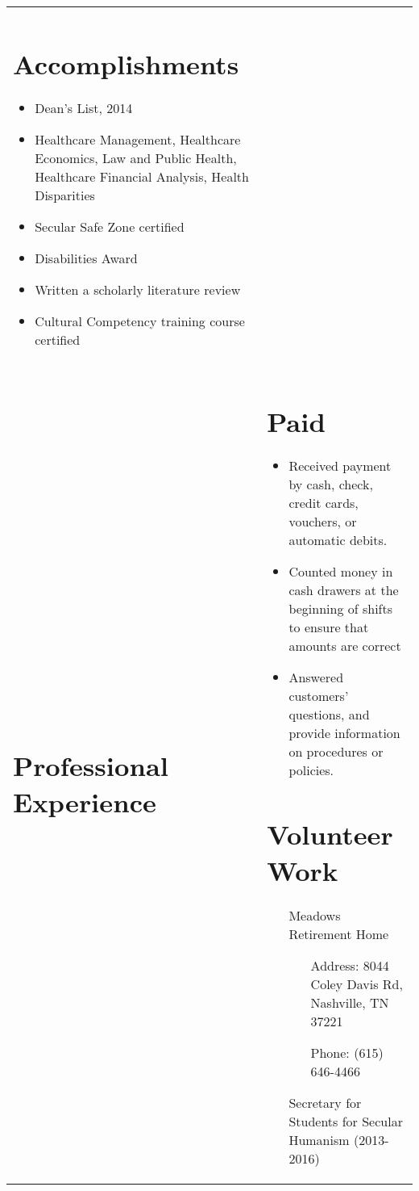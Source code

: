 \documentclass[10pt]{article} %
\begin{document}
\begin{tabularx}{\textwidth}{p{3cm} X}
\section*{Accomplishments}
\begin{itemize}
\setlength{\itemsep}{1pt}
\item Dean's List, 2014
\item Healthcare Management, Healthcare Economics, Law and Public Health, Healthcare
Financial Analysis, Health Disparities
\item Secular Safe Zone certified
\item Disabilities Award
\item Written a scholarly literature review
\item Cultural Competency training course certified
\end{itemize}\\

\section*{Professional Experience}  & \section*{Paid}
\begin{itemize}
\setlength{\itemsep}{1pt}
\item Received payment by cash, check, credit cards, vouchers, or automatic debits.
\item Counted money in cash drawers at the beginning of shifts to ensure that amounts are
correct
\item Answered customers' questions, and provide information on procedures or policies.
\end{itemize}

\section*{Volunteer Work}
\begin{itemize}
\setlength{\itemsep}{1pt}
 \item[] Meadows Retirement Home
\begin{itemize}
\setlength{\itemsep}{1pt}
 \item [Address: ] 8044 Coley Davis Rd, Nashville, TN 37221
\item [Phone: ] (615) 646-4466
\end{itemize}
\item[] Secretary for Students for Secular Humanism (2013-2016)
\end{itemize}

\end{tabularx}
\end{document}
